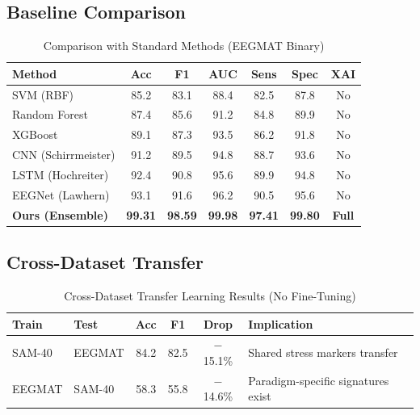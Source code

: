\documentclass[11pt,a4paper]{article}
\begin{document}
\subsection{Baseline Comparison}

\begin{table}[H]
\centering
\caption{Comparison with Standard Methods (EEGMAT Binary)}
\small
\begin{tabular}{lcccccc}
\toprule
\textbf{Method} & \textbf{Acc} & \textbf{F1} & \textbf{AUC} & \textbf{Sens} & \textbf{Spec} & \textbf{XAI} \\
\midrule
SVM (RBF) & 85.2 & 83.1 & 88.4 & 82.5 & 87.8 & No \\
Random Forest & 87.4 & 85.6 & 91.2 & 84.8 & 89.9 & No \\
XGBoost & 89.1 & 87.3 & 93.5 & 86.2 & 91.8 & No \\
CNN (Schirrmeister) & 91.2 & 89.5 & 94.8 & 88.7 & 93.6 & No \\
LSTM (Hochreiter) & 92.4 & 90.8 & 95.6 & 89.9 & 94.8 & No \\
EEGNet (Lawhern) & 93.1 & 91.6 & 96.2 & 90.5 & 95.6 & No \\
\midrule
\textbf{Ours (Ensemble)} & \textbf{99.31} & \textbf{98.59} & \textbf{99.98} & \textbf{97.41} & \textbf{99.80} & \textbf{Full} \\
\bottomrule
\end{tabular}
\end{table}

\subsection{Cross-Dataset Transfer}

\begin{table}[H]
\centering
\caption{Cross-Dataset Transfer Learning Results (No Fine-Tuning)}
\small
\begin{tabular}{llcccl}
\toprule
\textbf{Train} & \textbf{Test} & \textbf{Acc} & \textbf{F1} & \textbf{Drop} & \textbf{Implication} \\
\midrule
SAM-40 & EEGMAT & 84.2 & 82.5 & $-$15.1\% & Shared stress markers transfer \\
EEGMAT & SAM-40 & 58.3 & 55.8 & $-$14.6\% & Paradigm-specific signatures exist \\
\bottomrule
\end{tabular}
\end{table}

\end{document}
